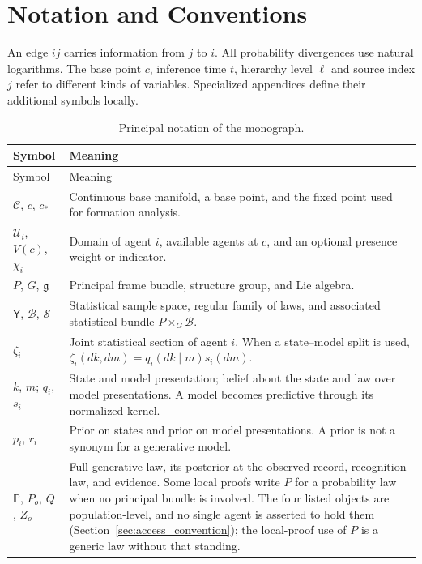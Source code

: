 \clearpage
\section{Notation and Conventions}\label{sec:notation}

An edge $ij$ carries information from $j$ to $i$. All probability divergences use natural logarithms. The base point $c$, inference time $t$, hierarchy level $\ell$ and source index $j$ refer to different kinds of variables. Specialized appendices define their additional symbols locally.

{\small
\setlength{\LTcapwidth}{\textwidth}
\begin{longtable}{@{}p{}p{}@{}}
\caption{Principal notation of the monograph.}\label{tab:notation}\\
\toprule Symbol & Meaning\\ \midrule
\endfirsthead
\toprule Symbol & Meaning\\ \midrule
\endhead
\bottomrule
\endfoot
$\mathcal C$, $c$, $c_*$ & Continuous base manifold, a base point, and the fixed point used for formation analysis.\\
$\mathcal U_i$, $V(c)$, $\chi_i$ & Domain of agent $i$, available agents at $c$, and an optional presence weight or indicator.\\
$P$, $G$, $\mathfrak g$ & Principal frame bundle, structure group, and Lie algebra.\\
$\mathsf Y$, $\mathcal B$, $\mathcal S$ & Statistical sample space, regular family of laws, and associated statistical bundle $P\times_G\mathcal B$.\\
$\zeta_i$ & Joint statistical section of agent $i$. When a state--model split is used, $\zeta_i(dk,dm)=q_i(dk\mid m)s_i(dm)$.\\
$k$, $m$; $q_i$, $s_i$ & State and model presentation; belief about the state and law over model presentations. A model becomes predictive through its normalized kernel.\\
$p_i$, $r_i$ & Prior on states and prior on model presentations. A prior is not a synonym for a generative model.\\
$\mathbb P$, $P_o$, $Q$, $Z_o$ & Full generative law, its posterior at the observed record, recognition law, and evidence. Some local proofs write $P$ for a probability law when no principal bundle is involved. The four listed objects are population-level, and no single agent is asserted to hold them (Section~\ref{sec:access_convention}); the local-proof use of $P$ is a generic law without that standing.\\

\end{longtable}}
